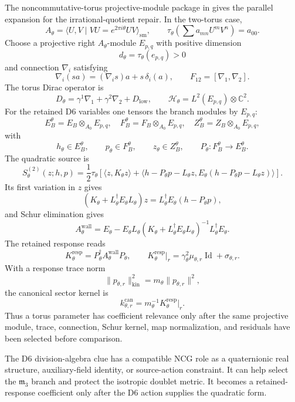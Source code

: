\documentclass[11pt]{article}
\newcommand{\CC}{\mathbb{C}}
\newcommand{\Id}{\operatorname{Id}}
\newcommand{\mthree}{\mathfrak m_3}
\begin{document}
The noncommutative-torus projective-module package in
\cite{ncg-nc-torus-projective-package} gives the parallel expansion for the
irrational-quotient repair.  In the two-torus case,
\[
  A_\theta=\langle U,V\mid VU=e^{2\pi i\theta}UV\rangle_{\mathrm{sm}},
  \qquad
  \tau_\theta\!\left(\sum a_{mn}U^mV^n\right)=a_{00}.
\]
Choose a projective right \(A_\theta\)-module \(E_{p,q}\) with positive
dimension
\[
  d_\theta=\tau_\theta(e_{p,q})>0
\]
and connection \(\nabla_i\) satisfying
\[
  \nabla_i(sa)=(\nabla_i s)a+s\,\delta_i(a),\qquad
  F_{12}=[\nabla_1,\nabla_2].
\]
The torus Dirac operator is
\[
  D_\theta=\gamma^1\nabla_1+\gamma^2\nabla_2+D_{\mathrm{low}},
  \qquad
  \mathcal H_\theta=L^2(E_{p,q})\otimes\CC^2 .
\]
For the retained D6 variables one tensors the branch modules by \(E_{p,q}\):
\[
  E_B^\theta=E_B\otimes_{A_0}E_{p,q},\quad
  F_B^\theta=F_B\otimes_{A_0}E_{p,q},\quad
  Z_B^\theta=Z_B\otimes_{A_0}E_{p,q},
\]
with
\[
  h_\theta\in E_B^\theta,\qquad
  p_\theta\in F_B^\theta,\qquad
  z_\theta\in Z_B^\theta,\qquad
  P_\theta:F_B^\theta\to E_B^\theta .
\]
The quadratic source is
\[
  S_\theta^{(2)}(z;h,p)
  =\frac{1}{2}\tau_\theta\!\left[
    \langle z,K_\theta z\rangle
    +\langle h-P_\theta p-L_\theta z,
      E_\theta(h-P_\theta p-L_\theta z)\rangle
  \right].
\]
Its first variation in \(z\) gives
\[
  (K_\theta+L_\theta^\dagger E_\theta L_\theta)z
  =L_\theta^\dagger E_\theta(h-P_\theta p),
\]
and Schur elimination gives
\[
  A_\theta^{\mathrm{wall}}
  =
    E_\theta
    -E_\theta L_\theta
     (K_\theta+L_\theta^\dagger E_\theta L_\theta)^{-1}
     L_\theta^\dagger E_\theta .
\]
The retained response reads
\[
  K_\theta^{\mathrm{resp}}
   =P_\theta^\dagger A_\theta^{\mathrm{wall}}P_\theta,\qquad
  K_\theta^{\mathrm{resp}}\vert_r
   =\gamma_\theta^2\mu_{\theta,r}\Id+\sigma_{\theta,r}.
\]
With a response trace norm
\[
  \|p_{\theta,r}\|_{\mathrm{kin}}^2
   =m_\theta\|p_{\theta,r}\|^2,
\]
the canonical sector kernel is
\[
  k_{\theta,r}^{\mathrm{can}}
   =m_\theta^{-1}K_\theta^{\mathrm{resp}}\vert_r .
\]
Thus a torus parameter has coefficient relevance only after the same
projective module, trace, connection, Schur kernel, map normalization, and
residuals have been selected before comparison.

The D6 division-algebra clue has a compatible NCG role as a quaternionic real
structure, auxiliary-field identity, or source-action constraint.  It can
help select the \(\mthree\) branch and protect the isotropic doublet metric.
It becomes a retained-response coefficient only after the D6 action supplies
the quadratic form.
\end{document}
